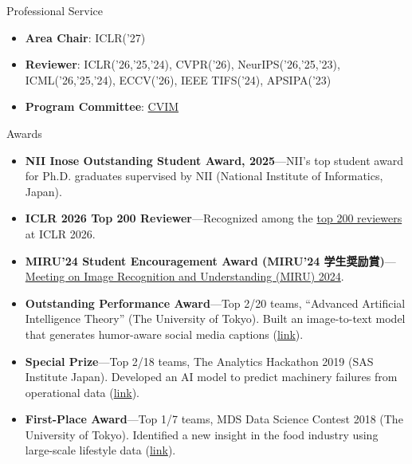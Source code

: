 \documentclass[]{mcdowellcv}
\begin{document}
\begin{cvsection}{Professional Service}
    \label{cvsec:scholorshop}
    \begin{cvsubsection}{}{}{}
        \begin{itemize}
            \item \textbf{Area Chair}: ICLR('27)
            \item \textbf{Reviewer}: ICLR('26,'25,'24), CVPR('26), NeurIPS('26,'25,'23), ICML('26,'25,'24), ECCV('26), IEEE TIFS('24), APSIPA('23)
            \item \textbf{Program Committee}: \href{https://cvim.ipsj.or.jp/index.php?id=member2026}{CVIM}
        \end{itemize}
    \end{cvsubsection}
\end{cvsection}

\begin{cvsection}{Awards}
  \begin{cvsubsection}{}{}{}
    \begin{itemize}
      \item \textbf{NII Inose Outstanding Student Award, 2025}---NII's top student award for Ph.D. graduates supervised by NII (National Institute of Informatics, Japan).
      \item \textbf{ICLR 2026 Top 200 Reviewer}---Recognized among the \href{https://iclr.cc/Conferences/2026/ProgramCommittee}{top 200 reviewers} at ICLR 2026.
      \item \textbf{MIRU'24 Student Encouragement Award (MIRU'24 学生奨励賞)}---\href{https://miru-committee.github.io/miru2024/}{Meeting on Image Recognition and Understanding (MIRU) 2024}.
      \item \textbf{Outstanding Performance Award}---Top 2/20 teams, ``Advanced Artificial Intelligence Theory'' (The University of Tokyo). Built an image-to-text model that generates humor-aware social media captions (\href{https://futa-waseda.netlify.app/project/twitter_image_captioning/}{link}).
      \item \textbf{Special Prize}---Top 2/18 teams, The Analytics Hackathon 2019 (SAS Institute Japan). Developed an AI model to predict machinery failures from operational data (\href{https://enterprisezine.jp/article/detail/12209?p=2}{link}).
      \item \textbf{First-Place Award}---Top 1/7 teams, MDS Data Science Contest 2018 (The University of Tokyo). Identified a new insight in the food industry using large-scale lifestyle data (\href{http://www.mi.u-tokyo.ac.jp/industry_consortium.html}{link}).
    \end{itemize}
  \end{cvsubsection}
\end{cvsection}
\end{document}
